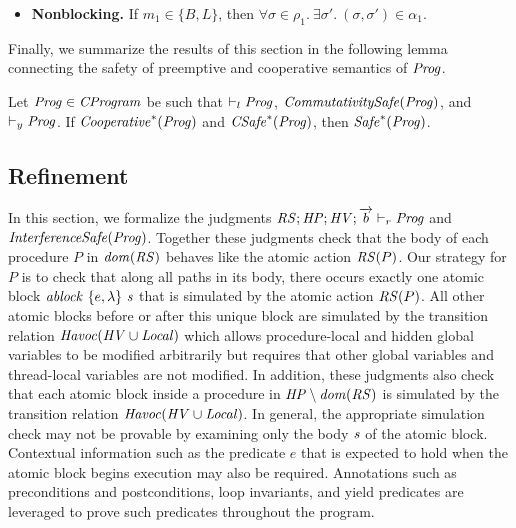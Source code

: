 \begin{itemize}
\item {\bf Nonblocking.}
If $m_1 \in \{B, L\}$, then
$\forall \sigma \in \rho_1.\ \exists \sigma'.\ (\sigma, \sigma') \in \alpha_1$.
\end{itemize}

Finally, we summarize the results of this section in the following lemma connecting the safety
of preemptive and cooperative semantics of $\mathit{Prog}$.
\begin{lemma}
Let $\mathit{Prog} \in \mathit{CProgram}$ be such that $\vdash_l \mathit{Prog}$, $\mathit{CommutativitySafe}(\mathit{Prog})$, and $\vdash_y \mathit{Prog}$.
If $\mathit{Cooperative}^*(\mathit{Prog})$ and $\mathit{CSafe}^*(\mathit{Prog})$, then $\mathit{Safe}^*(\mathit{Prog})$.
\end{lemma}

\subsection{Refinement}
\label{sec:refinement}

In this section, we formalize the judgments $\mathit{RS};\mathit{HP};\mathit{HV};\overrightarrow{b} \vdash_r \mathit{Prog}$ and $\mathit{InterferenceSafe}(\mathit{Prog})$.
Together these judgments check that the body of each procedure $P$ in $\mathit{dom}(\mathit{RS})$ behaves like the atomic action $\mathit{RS}(P)$.
Our strategy for $P$ is to check that along all paths in its body, there occurs exactly one atomic block 
$\mathit{ablock}\ {\{e,\lambda\}}\ {\mathit{s}}$ that is simulated by the atomic action $\mathit{RS}(P)$.
All other atomic blocks before or after this unique block are simulated by the transition relation $\mathit{Havoc}(\mathit{HV} \cup \mathit{Local})$ 
which allows procedure-local and hidden global variables to be modified arbitrarily but requires that other global variables and thread-local variables are not modified.
In addition, these judgments also check that each atomic block inside a procedure in $\mathit{HP} \setminus \mathit{dom}(\mathit{RS})$ 
is simulated by the transition relation $\mathit{Havoc}(\mathit{HV} \cup \mathit{Local})$.
In general, the appropriate simulation check may not be provable by examining only the body $\mathit{s}$ of the atomic block.
Contextual information such as the predicate $e$ that is expected to hold when the atomic block begins execution may also be required.
Annotations such as preconditions and postconditions, loop invariants, and yield predicates are leveraged to prove 
such predicates throughout the program.

